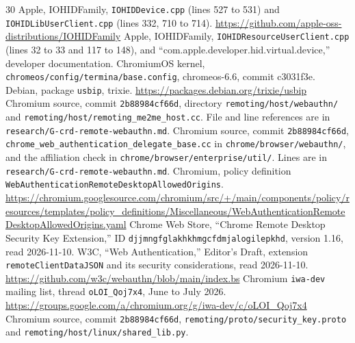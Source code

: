 \documentclass[journal,9pt]{IEEEtran}
\theoremstyle{definition}
\theoremstyle{remark}
\newcommand{\code}[1]{\texttt{#1}}
\begin{document}
\begin{thebibliography}{30}
 Apple, IOHIDFamily, \code{IOHIDDevice.cpp} (lines 527 to 531) and
  \code{IOHIDLibUserClient.cpp} (lines 332, 710 to 714).
  \url{https://github.com/apple-oss-distributions/IOHIDFamily}
 Apple, IOHIDFamily, \code{IOHIDResourceUserClient.cpp} (lines 32 to 33 and 117 to 148),
  and ``com.apple.developer.hid.virtual.device,'' developer documentation.
 ChromiumOS kernel, \code{chromeos/config/termina/base.config}, chromeos-6.6, commit c3031f3e.
 Debian, package \code{usbip}, trixie. \url{https://packages.debian.org/trixie/usbip}
 Chromium source, commit \code{2b88984cf66d}, directory
  \code{remoting/host/webauthn/} and \code{remoting/host/remoting\_me2me\_host.cc}.
  File and line references are in \code{research/G-crd-remote-webauthn.md}.
 Chromium source, commit \code{2b88984cf66d},
  \code{chrome\_web\_authentication\_delegate\_base.cc} in
  \code{chrome/browser/webauthn/}, and the affiliation check in
  \code{chrome/browser/enterprise/util/}. Lines are in
  \code{research/G-crd-remote-webauthn.md}.
 Chromium, policy definition
  \code{WebAuthentication}\allowbreak\code{RemoteDesktop}\allowbreak\code{AllowedOrigins}.
  \url{https://chromium.googlesource.com/chromium/src/+/main/components/policy/resources/templates/policy_definitions/Miscellaneous/WebAuthenticationRemoteDesktopAllowedOrigins.yaml}
 Chrome Web Store, ``Chrome Remote Desktop Security Key Extension,''
  ID \code{djjmngfglakhkhmgcfdmjalogilepkhd}, version 1.16, read 2026-11-10.
 W3C, ``Web Authentication,'' Editor's Draft, extension
  \code{remoteClientDataJSON} and its security considerations, read 2026-11-10.
  \url{https://github.com/w3c/webauthn/blob/main/index.bs}
 Chromium \code{iwa-dev} mailing list, thread \code{oLOI\_Qoj7x4}, June to July 2026.
  \url{https://groups.google.com/a/chromium.org/g/iwa-dev/c/oLOI_Qoj7x4}
 Chromium source, commit \code{2b88984cf66d},
  \code{remoting/proto/security\_key.proto} and
  \code{remoting/host/linux/shared\_lib.py}.
\end{thebibliography}
\end{document}
